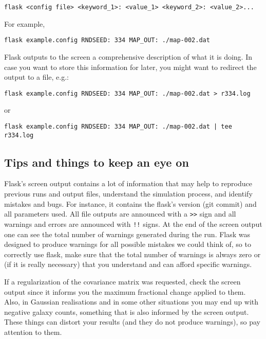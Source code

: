 \documentclass[12pt]{book} %
\begin{document}
\vspace{0.5cm}
\noindent
{\tt flask <config file> <keyword\_1>: <value\_1> <keyword\_2>: <value\_2>...}
\vspace{0.5cm}

\noindent
For example,

\vspace{0.5cm}
\noindent
{\tt flask example.config RNDSEED: 334 MAP\_OUT: ./map-002.dat}
\vspace{0.5cm}

{\sc Flask} outputs to the screen a comprehensive description of what it is doing. In case you want to 
store this information for later, you might want to redirect the output to a file, e.g.: 

\vspace{0.5cm}
\noindent
{\tt flask example.config RNDSEED: 334 MAP\_OUT: ./map-002.dat > r334.log}

\noindent
or

\noindent
{\tt flask example.config RNDSEED: 334 MAP\_OUT: ./map-002.dat | tee r334.log}
\vspace{0.5cm}


\subsection{Tips and things to keep an eye on}
\label{sec:tips}

{\sc Flask}'s screen output contains a lot of information that may help 
to reproduce previous runs and output files, understand the simulation process, 
and identify mistakes and bugs. For instance, it contains the {\sc flask}'s version 
(git commit) and all parameters used. All file outputs are announced with a {\tt >>} sign 
and all warnings and errors are announced with {\tt !!} signs. At the end of the 
screen output one can see the total number of warnings generated during the run. 
{\sc Flask} was designed to produce warnings for all possible mistakes we could think of, so 
to correctly use {\sc flask}, make sure that the total number of warnings is always zero 
or (if it is really necessary) that you understand and can afford specific warnings.

If a regularization of the covariance matrix was requested, check the screen output 
since it informs you the maximum fractional change applied to them. Also, in Gaussian 
realisations and in some other situations you may end up with negative galaxy counts, 
something that is also informed by the screen output. These things can distort your 
results (and they do not produce warnings), so pay attention to them. 
\end{document}
